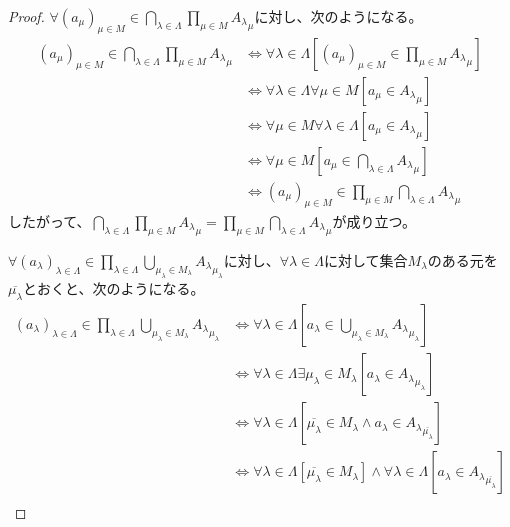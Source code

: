 \documentclass[a4paper]{jsarticle}
\begin{document}
\begin{proof}
$\forall\left( a_{\mu} \right)_{\mu \in M} \in \bigcap_{\lambda \in \varLambda} {\prod_{\mu \in M} {A_{\lambda}}_{\mu}}$に対し、次のようになる。
\begin{align*}
\left( a_{\mu} \right)_{\mu \in M} \in \bigcap_{\lambda \in \varLambda} {\prod_{\mu \in M} {A_{\lambda}}_{\mu}} &\Leftrightarrow \forall\lambda \in \varLambda\left[ \left( a_{\mu} \right)_{\mu \in M} \in \prod_{\mu \in M} {A_{\lambda}}_{\mu} \right]\\
&\Leftrightarrow \forall\lambda \in \varLambda\forall\mu \in M\left[ a_{\mu} \in {A_{\lambda}}_{\mu} \right]\\
&\Leftrightarrow \forall\mu \in M\forall\lambda \in \varLambda\left[ a_{\mu} \in {A_{\lambda}}_{\mu} \right]\\
&\Leftrightarrow \forall\mu \in M\left[ a_{\mu} \in \bigcap_{\lambda \in \varLambda} {A_{\lambda}}_{\mu} \right]\\
&\Leftrightarrow \left( a_{\mu} \right)_{\mu \in M} \in \prod_{\mu \in M} {\bigcap_{\lambda \in \varLambda} {A_{\lambda}}_{\mu}}
\end{align*}
したがって、$\bigcap_{\lambda \in \varLambda} {\prod_{\mu \in M} {A_{\lambda}}_{\mu}} = \prod_{\mu \in M} {\bigcap_{\lambda \in \varLambda} {A_{\lambda}}_{\mu}}$が成り立つ。\par
$\forall\left( a_{\lambda} \right)_{\lambda \in \varLambda} \in \prod_{\lambda \in \varLambda} {\bigcup_{\mu_{\lambda} \in M_{\lambda}} {A_{\lambda}}_{\mu_{\lambda}}}$に対し、$\forall\lambda \in \varLambda$に対して集合$M_{\lambda}$のある元を$\overline{\mu_{\lambda}}$とおくと、次のようになる。
\begin{align*}
\left( a_{\lambda} \right)_{\lambda \in \varLambda} \in \prod_{\lambda \in \varLambda} {\bigcup_{\mu_{\lambda} \in M_{\lambda}} {A_{\lambda}}_{\mu_{\lambda}}} &\Leftrightarrow \forall\lambda \in \varLambda\left[ a_{\lambda} \in \bigcup_{\mu_{\lambda} \in M_{\lambda}} {A_{\lambda}}_{\mu_{\lambda}} \right]\\
&\Leftrightarrow \forall\lambda \in \varLambda\exists\mu_{\lambda} \in M_{\lambda}\left[ a_{\lambda} \in {A_{\lambda}}_{\mu_{\lambda}} \right]\\
&\Leftrightarrow \forall\lambda \in \varLambda\left[ \overline{\mu_{\lambda}} \in M_{\lambda} \land a_{\lambda} \in {A_{\lambda}}_{\overline{\mu_{\lambda}}} \right]\\
&\Leftrightarrow \forall\lambda \in \varLambda\left[ \overline{\mu_{\lambda}} \in M_{\lambda} \right] \land \forall\lambda \in \varLambda\left[ a_{\lambda} \in {A_{\lambda}}_{\overline{\mu_{\lambda}}} \right]\\

\end{align*}
\end{proof}
\end{document}
